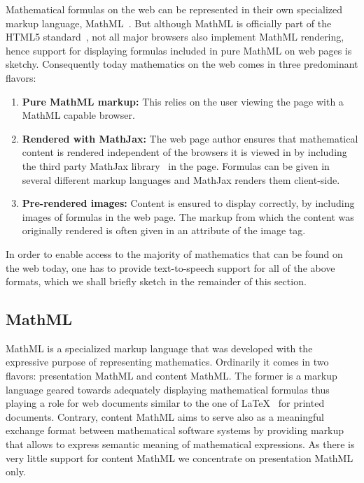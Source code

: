 \documentclass{sig-alternate}
\begin{document}
Mathematical formulas on the web can be represented in their own specialized
markup language, MathML~\cite{MathML3}. But although MathML is officially part
of the HTML5 standard~\cite{HTML5}, not all major browsers also implement MathML
rendering, hence support for displaying formulas included in pure MathML on web
pages is sketchy. Consequently today mathematics on the web comes in three
predominant flavors:
\begin{enumerate}
\item \textbf{Pure MathML markup:} This relies on the user viewing the page with
  a MathML capable browser.
\item \textbf{Rendered with MathJax:} The web page author ensures that
  mathematical content is rendered independent of the browsers it is viewed in
  by including the third party MathJax library~\cite{MathJax2.2} in the
  page. Formulas can be given in several different markup languages and MathJax
  renders them client-side.
\item \textbf{Pre-rendered images:} Content is ensured to display correctly, by
  including images of formulas in the web page. The markup from which the
  content was originally rendered is often given in an attribute of the image
  tag.
\end{enumerate}

In order to enable access to the majority of mathematics that can be found on
the web today, one has to provide text-to-speech support for all of the above
formats, which we shall briefly sketch in the remainder of this section.

\subsection{MathML}
\label{sec:mathml}

MathML is a specialized markup language that was developed with the expressive
purpose of representing mathematics. Ordinarily it comes in two flavors:
presentation MathML and content MathML. The former is a markup language geared
towards adequately displaying mathematical formulas thus playing a role for web
documents similar to the one of {\LaTeX}~\cite{lamport1986latex} for printed
documents.  Contrary, content MathML aims to serve also as a meaningful exchange
format between mathematical software systems by providing markup that allows to
express semantic meaning of mathematical expressions. As there is very little
support for content MathML we concentrate on presentation MathML only.
  
\end{document}
